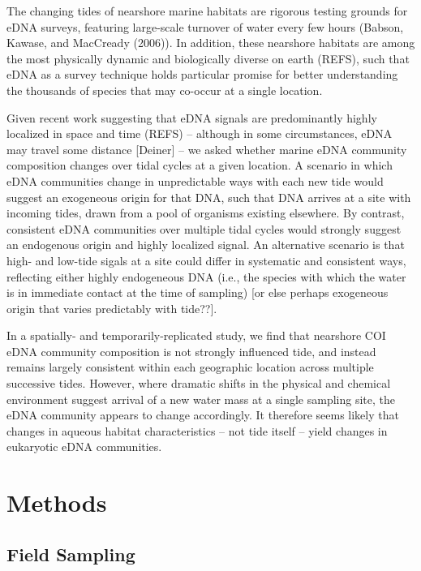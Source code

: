 \documentclass[fleqn,10pt,lineno]{wlpeerj} %
\begin{document}
The changing tides of nearshore marine habitats are rigorous testing
grounds for eDNA surveys, featuring large-scale turnover of water every
few hours (Babson, Kawase, and MacCready (2006)). In addition, these
nearshore habitats are among the most physically dynamic and
biologically diverse on earth (REFS), such that eDNA as a survey
technique holds particular promise for better understanding the
thousands of species that may co-occur at a single location.

Given recent work suggesting that eDNA signals are predominantly highly
localized in space and time (REFS) -- although in some circumstances,
eDNA may travel some distance {[}Deiner{]} -- we asked whether marine
eDNA community composition changes over tidal cycles at a given
location. A scenario in which eDNA communities change in unpredictable
ways with each new tide would suggest an exogeneous origin for that DNA,
such that DNA arrives at a site with incoming tides, drawn from a pool
of organisms existing elsewhere. By contrast, consistent eDNA
communities over multiple tidal cycles would strongly suggest an
endogenous origin and highly localized signal. An alternative scenario
is that high- and low-tide sigals at a site could differ in systematic
and consistent ways, reflecting either highly endogeneous DNA (i.e., the
species with which the water is in immediate contact at the time of
sampling) {[}or else perhaps exogeneous origin that varies predictably
with tide??{]}.

In a spatially- and temporarily-replicated study, we find that nearshore
COI eDNA community composition is not strongly influenced tide, and
instead remains largely consistent within each geographic location
across multiple successive tides. However, where dramatic shifts in the
physical and chemical environment suggest arrival of a new water mass at
a single sampling site, the eDNA community appears to change
accordingly. It therefore seems likely that changes in aqueous habitat
characteristics -- not tide itself -- yield changes in eukaryotic eDNA
communities.

\section{Methods}\label{methods}

\subsection{Field Sampling}\label{field-sampling}
\end{document}
